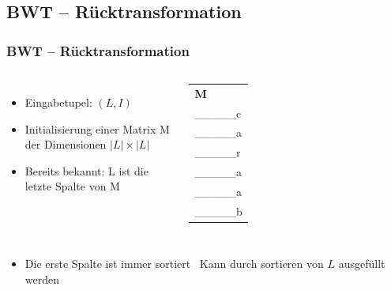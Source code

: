 \documentclass[14pt,xcolor=dvipsnames,pdftex]{beamer}
\begin{document}
\subsection{BWT -- Rücktransformation}
\begin{frame}[allowframebreaks]
\frametitle{BWT -- Rücktransformation}
\begin{columns}[c,onlytextwidth]
 \begin{itemize}
  \item Eingabetupel: $(L,I)$
  \item Initialisierung einer Matrix M der Dimensionen $|L| \times |L|$
  \item Bereits bekannt: L ist die {\color{blue}letzte Spalte} von M
 \end{itemize}
    \begin{tabular}{T}
    \textbf{M} \\
    \_\_\_\_\_{\color{blue}c} \\
    \_\_\_\_\_{\color{blue}a} \\
    \_\_\_\_\_{\color{blue}r} \\
    \_\_\_\_\_{\color{blue}a} \\
    \_\_\_\_\_{\color{blue}a} \\
    \_\_\_\_\_{\color{blue}b}
    \end{tabular}
\end{columns}
\framebreak
\begin{columns}[c,onlytextwidth]
 \begin{itemize}
  \item Die {\color{blue}erste Spalte} ist immer sortiert
  \textrightarrow\ Kann durch sortieren von $L$ ausgefüllt werden
 \end{itemize}


\end{columns}
\end{frame}
\end{document}
